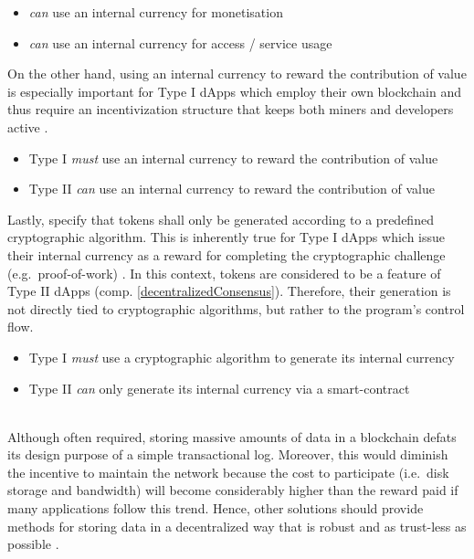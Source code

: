 \begin{description}[format={\storedescriptionlabel}]
	\begin{itemize}
  		\item \textit{can} use an internal currency for monetisation
  		\item \textit{can} use an internal currency for access / service usage
	\end{itemize}
	
	On the other hand, using an internal currency to reward the contribution of value is especially important for Type I \acp{dApp} which employ their own blockchain and thus require an incentivization structure that keeps both miners and developers active \cite[p.~9]{Raval.2016}.
	
	\begin{itemize}
		\item Type I \textit{must} use an internal currency to reward the contribution of value
		\item Type II \textit{can} use an internal currency to reward the contribution of value
	\end{itemize}
	
	Lastly, \citeauthor{Johnston2015} specify that tokens shall only be generated according to a predefined cryptographic algorithm. This is inherently true for Type I \acp{dApp} which issue their internal currency as a reward for completing the cryptographic challenge (e.g.~proof-of-work) \cite[pp.~3-4]{bitcoin}. In this context, tokens are considered to be a feature of Type II \acp{dApp} (comp. \ref{decentralizedConsensus}). Therefore, their generation is not directly tied to cryptographic algorithms, but rather to the program's control flow.
	
	\begin{itemize}
		\item Type I \textit{must} use a cryptographic algorithm to generate its internal currency
		\item Type II \textit{can} only generate its internal currency via a smart-contract
	\end{itemize}
	
	\item[Decentralized protocols]
	\hfill \\
	Although often required, storing massive amounts of data in a blockchain defats its design purpose of a simple transactional log. Moreover, this would diminish the incentive to maintain the network because the cost to participate (i.e.~disk storage and bandwidth) will become considerably higher than the reward paid if many applications follow this trend. Hence, other solutions should provide methods for storing data in a decentralized way that is robust and as trust-less as possible \cite[pp.~25]{Raval.2016}.  
	

\end{description}
